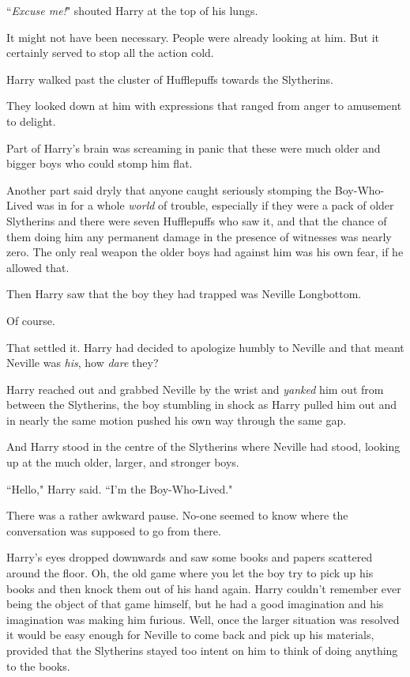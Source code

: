 ``\emph{Excuse me!}" shouted Harry at the top of his lungs.

It might not have been necessary. People were already looking at him. But it certainly served to stop all the action cold.

Harry walked past the cluster of Hufflepuffs towards the Slytherins.

They looked down at him with expressions that ranged from anger to amusement to delight.

Part of Harry's brain was screaming in panic that these were much older and bigger boys who could stomp him flat.

Another part said dryly that anyone caught seriously stomping the Boy-Who-Lived was in for a whole \emph{world} of trouble, especially if they were a pack of older Slytherins and there were seven Hufflepuffs who saw it, and that the chance of them doing him any permanent damage in the presence of witnesses was nearly zero. The only real weapon the older boys had against him was his own fear, if he allowed that.

Then Harry saw that the boy they had trapped was Neville Longbottom.

Of course.

That settled it. Harry had decided to apologize humbly to Neville and that meant Neville was \emph{his}, how \emph{dare} they?

Harry reached out and grabbed Neville by the wrist and \emph{yanked} him out from between the Slytherins, the boy stumbling in shock as Harry pulled him out and in nearly the same motion pushed his own way through the same gap.

And Harry stood in the centre of the Slytherins where Neville had stood, looking up at the much older, larger, and stronger boys.

``Hello," Harry said. ``I'm the Boy-Who-Lived."

There was a rather awkward pause. No-one seemed to know where the conversation was supposed to go from there.

Harry's eyes dropped downwards and saw some books and papers scattered around the floor. Oh, the old game where you let the boy try to pick up his books and then knock them out of his hand again. Harry couldn't remember ever being the object of that game himself, but he had a good imagination and his imagination was making him furious. Well, once the larger situation was resolved it would be easy enough for Neville to come back and pick up his materials, provided that the Slytherins stayed too intent on him to think of doing anything to the books.


